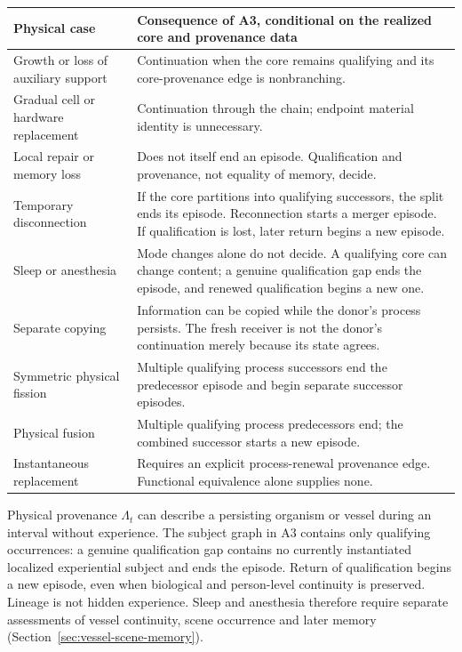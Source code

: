 \begin{center}\small
\begin{tabularx}{\textwidth}{@{}p{}Y@{}}\toprule
Physical case & Consequence of A3, conditional on the realized core and provenance data\\\midrule
Growth or loss of auxiliary support & Continuation when the core remains qualifying and its core-provenance edge is nonbranching.\\
Gradual cell or hardware replacement & Continuation through the chain; endpoint material identity is unnecessary.\\
Local repair or memory loss & Does not itself end an episode. Qualification and provenance, not equality of memory, decide.\\
Temporary disconnection & If the core partitions into qualifying successors, the split ends its episode. Reconnection starts a merger episode. If qualification is lost, later return begins a new episode.\\
Sleep or anesthesia & Mode changes alone do not decide. A qualifying core can change content; a genuine qualification gap ends the episode, and renewed qualification begins a new one.\\
Separate copying & Information can be copied while the donor's process persists. The fresh receiver is not the donor's continuation merely because its state agrees.\\
Symmetric physical fission & Multiple qualifying process successors end the predecessor episode and begin separate successor episodes.\\
Physical fusion & Multiple qualifying process predecessors end; the combined successor starts a new episode.\\
Instantaneous replacement & Requires an explicit process-renewal provenance edge. Functional equivalence alone supplies none.\\\bottomrule
\end{tabularx}
\end{center}

Physical provenance $\Lambda_t$ can describe a persisting organism or vessel during an interval without experience. The subject graph in A3 contains only qualifying occurrences: a genuine qualification gap contains no currently instantiated localized experiential subject and ends the episode. Return of qualification begins a new episode, even when biological and person-level continuity is preserved. Lineage is not hidden experience. Sleep and anesthesia therefore require separate assessments of vessel continuity, scene occurrence and later memory (Section~\ref{sec:vessel-scene-memory}).

